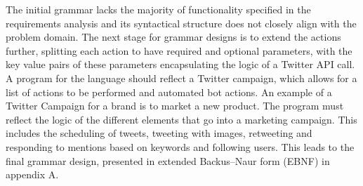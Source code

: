 The initial grammar lacks the majority of functionality specified in the requirements analysis and its syntactical structure does not closely align with the problem domain. The next stage for grammar designs is to extend the actions further, splitting each action to have required and optional parameters, with the key value pairs of these parameters encapsulating the logic of a Twitter API call. A program for the language should reflect a Twitter campaign, which allows for a list of actions to be performed and automated bot actions. An example of a Twitter Campaign for a brand is to market a new product. The program must reflect the logic of the different elements that go into a marketing campaign. This includes the scheduling of tweets, tweeting with images, retweeting and responding to mentions based on keywords and following users. This leads to the final grammar design, presented in extended Backus–Naur form (EBNF) in appendix A.